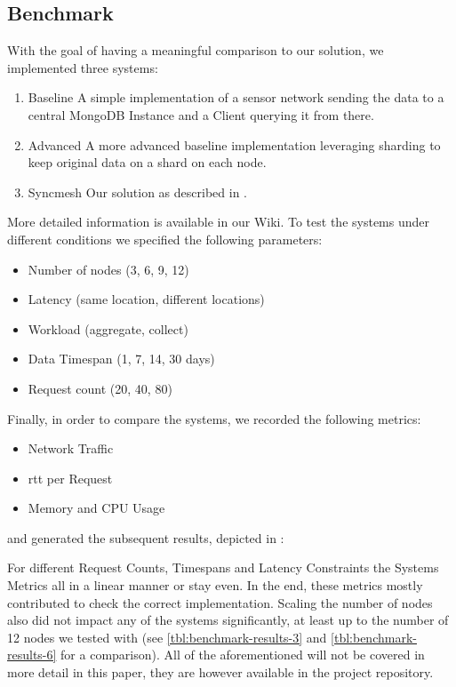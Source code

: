 \documentclass[conference]{IEEEtran}
\begin{document}
\subsection{Benchmark}

With the goal of having a meaningful comparison to our solution, we implemented three systems: 

\begin{enumerate}
  \item Baseline \newline
  A simple implementation of a sensor network sending the data to a central MongoDB Instance and a Client querying it from there.
  \item Advanced \newline
  A more advanced baseline implementation leveraging sharding to keep original data on a shard on each node. 
  \item Syncmesh \newline
  Our solution as described in . 
\end{enumerate}
More detailed information is available in our Wiki. 
To test the systems under different conditions we specified the following parameters:
\begin{itemize}
    \item Number of nodes (3, 6, 9, 12)
    \item Latency (same location, different locations)
    \item Workload (aggregate, collect)
    \item Data Timespan (1, 7, 14, 30 days)
    \item Request count (20, 40, 80)\label{param:request_count}
\end{itemize}
Finally, in order to compare the systems, we recorded the following metrics: 
\begin{itemize}
    \item Network Traffic
    \item \acf{rtt} per Request
    \item Memory and CPU Usage
\end{itemize}
and generated the subsequent results, depicted in :

For different Request Counts, Timespans and Latency Constraints the Systems Metrics all in a linear manner or stay even. In the end, these metrics mostly contributed to check the correct implementation.
Scaling the number of nodes also did not impact any of the systems significantly, at least up to the number of 12 nodes we tested with (see \autoref{tbl:benchmark-results-3} and \autoref{tbl:benchmark-results-6} for a comparison). 
All of the aforementioned will not be covered in more detail in this paper, they are however available in the project repository.
\end{document}
